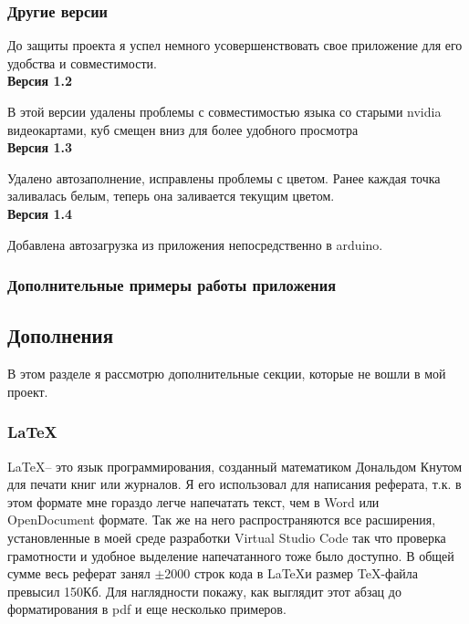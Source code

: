 \documentclass[a4paper, 12pt]{article}
\begin{document}
\newpage

\subsubsection{Другие версии}

До защиты проекта я успел немного усовершенствовать свое приложение для его
удобства и совместимости.\\
\textbf{Версия 1.2}

В этой версии удалены проблемы с совместимостью языка со старыми nvidia
видеокартами, куб смещен вниз для более удобного просмотра\\
\textbf{Версия 1.3}

Удалено автозаполнение, исправлены проблемы с цветом. Ранее каждая точка
заливалась белым, теперь она заливается текущим цветом.\\
\textbf{Версия 1.4}

Добавлена автозагрузка из приложения непосредственно в arduino.
\subsubsection{Дополнительные примеры работы приложения}


\newpage

\subsection{Дополнения}

В этом разделе я рассмотрю дополнительные секции, которые не вошли в мой
проект.

\subsubsection{\LaTeX}

\LaTeX -- это язык программирования, созданный математиком Дональдом Кнутом для
печати книг или журналов. Я его использовал для написания реферата, т.к. в этом
формате мне гораздо легче напечатать текст, чем в Word или OpenDocument
формате. Так же на него распространяются все расширения, установленные в моей
среде разработки Virtual Studio Code так что проверка грамотности и удобное
выделение напечатанного тоже было доступно. В общей сумме весь реферат занял
$\pm$2000 строк кода в \LaTeX и размер \TeX-файла превысил 150Кб. Для
наглядности покажу, как выглядит этот абзац до форматирования в pdf и еще
несколько примеров.
\end{document}
